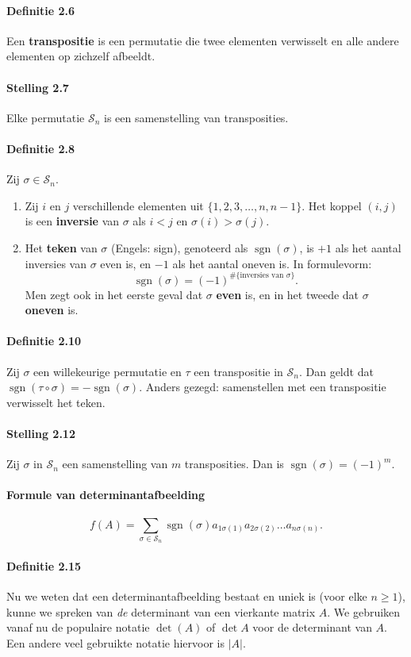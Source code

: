 \documentclass[11pt,oneside,a4paper]{article}
\DeclareMathOperator{\sign}{sgn}
\begin{document}
	\paragraph{Definitie 2.6}
		Een \textbf{transpositie} is een permutatie die twee elementen verwisselt en alle andere elementen op zichzelf afbeeldt.
	\paragraph{Stelling 2.7}
		Elke permutatie $\mathcal{S}_n$ is een samenstelling van transposities.
	\paragraph{Definitie 2.8}
		Zij $\sigma \in \mathcal{S}_n$.
		\begin{enumerate}
			\item Zij $i$ en $j$ verschillende elementen uit $\{1,2,3,\ldots ,n,n-1\}$. Het koppel $(i,j)$ is een \textbf{inversie} van $\sigma$ als $i<j$ en $\sigma(i)>\sigma(j)$.
			\item Het \textbf{teken} van $\sigma$ (Engels: sign), genoteerd als $\sign(\sigma)$, is $+1$ als het aantal inversies van $\sigma$ even is, en $-1$ als het aantal oneven is. In formulevorm: $$\sign(\sigma) = (-1)^{\text{\# \{inversies van $\sigma$\}}}.$$
			Men zegt ook in het eerste geval dat $\sigma$ \textbf{even} is, en in het tweede dat $\sigma$ \textbf{oneven} is.
		\end{enumerate}
	\paragraph{Definitie 2.10}
		Zij $\sigma$ een willekeurige permutatie en $\tau$ een transpositie in $\mathcal{S}_n$. Dan geldt dat $\sign(\tau \circ \sigma) = -\sign(\sigma)$. Anders gezegd: samenstellen met een transpositie verwisselt het teken.
	\paragraph{Stelling 2.12}
		Zij $\sigma$ in $\mathcal{S}_n$ een samenstelling van $m$ transposities. Dan is $\sign(\sigma) = (-1)^m$.
	\paragraph{Formule van determinantafbeelding}
	$$f(A) = \sum\limits_{\sigma \in \mathcal{S}_n} \sign(\sigma)a_{1\sigma(1)}a_{2\sigma(2)}\ldots a_{n\sigma(n)}.$$
	\paragraph{Definitie 2.15}
		Nu we weten dat een determinantafbeelding bestaat en uniek is (voor elke $n \ge 1$), kunne we spreken van \textit{de} determinant van een vierkante matrix $A$. We gebruiken vanaf nu de populaire notatie $\det(A)$ of $\det A$ voor de determinant van $A$. Een andere veel gebruikte notatie hiervoor is $|A|$.
\end{document}
